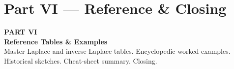 \documentclass[aspectratio=169,11pt]{beamer}
\begin{document}

\section{Part VI --- Reference \& Closing}

{
\begin{frame}[plain]
\vspace{2cm}
{\color{accentorange}\Huge\textbf{PART VI}}\\[0.4cm]
{\color{white}\Huge\textbf{Reference Tables \& Examples}}\\[0.8cm]
{\color{white!85}\large Master Laplace and inverse-Laplace tables. Encyclopedic worked examples.\\
Historical sketches. Cheat-sheet summary. Closing.}
\end{frame}
}
\end{document}
